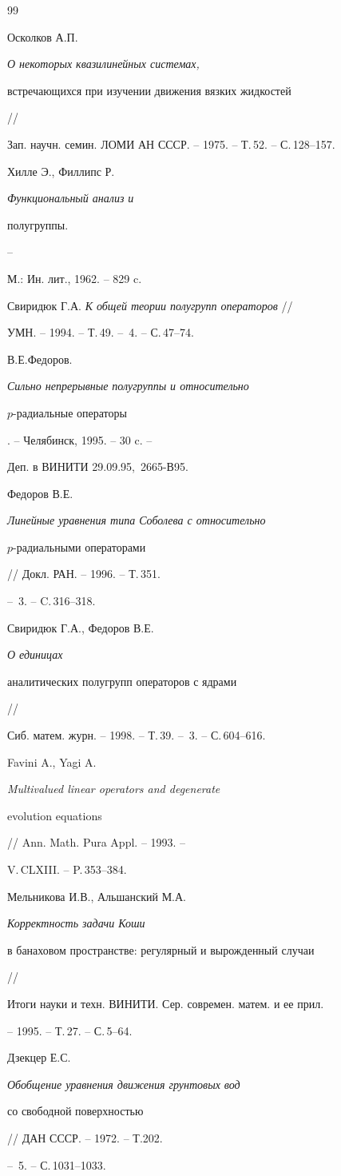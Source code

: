 \begin{thebibliography}{99} 







Осколков А.П. {\it О некоторых квазилинейных системах,


встречающихся при изучении движения вязких жидкостей} //


Зап. научн. семин. ЛОМИ АН СССР. -- 1975. -- Т.\,52. -- С.\,128--157.




Хилле Э., Филлипс Р. {\it Функциональный анализ и


полугруппы.} --


М.: Ин. лит., 1962. -- 829 c.




Свиридюк Г.А. {\it К общей теории полугрупп операторов} //


УМН. -- 1994. -- Т.\,49. -- \No\,4. -- С.\,47--74.




В.Е.Федоров. {\it Сильно непрерывные полугруппы и относительно


$p$-радиальные операторы}. -- Челябинск, 1995. -- 30 c. --


Деп. в ВИНИТИ 29.09.95, \No\,2665-В95.




Федоров В.Е. {\it Линейные уравнения типа Соболева с относительно


$p$-радиальными операторами} // Докл. РАН. -- 1996. -- Т.\,351.


-- \No\,3. -- C.\,316--318.




Свиридюк Г.А., Федоров В.Е. {\it О единицах


аналитических полугрупп операторов с ядрами} //


Сиб. матем. журн. -- 1998. -- Т.\,39. -- \No\,3. -- С.\,604--616.




Favini A., Yagi A. {\it Multivalued linear operators and degenerate


evolution equations} // Ann. Math. Pura Appl. -- 1993. --


V.\,CLXIII. -- P.\,353--384.




Мельникова И.В., Альшанский М.А. {\it Корректность задачи Коши


в банаховом пространстве: регулярный и вырожденный случаи} //


Итоги науки и техн. ВИНИТИ. Сер. современ. матем. и ее прил.


-- 1995. -- Т.\,27. -- С.\,5--64.




Дзекцер Е.С. {\it Обобщение уравнения движения грунтовых вод


со свободной поверхностью} // ДАН СССР. -- 1972. -- Т.202.


-- \No\,5. -- С.\,1031--1033.





\end{thebibliography} 

